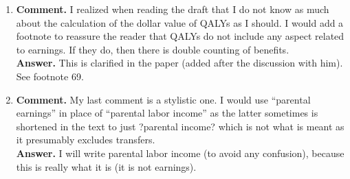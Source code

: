 \begin{enumerate}
\item 
\noindent \textbf{Comment.} I realized when reading the draft that I do not know as much about the calculation of the dollar value of QALYs as I should. I would add a footnote to reassure the reader that QALYs do not include any aspect related to earnings. If they do, then there is double counting of benefits.\\

\noindent \textbf{Answer.} This is clarified in the paper (added after the discussion with him). See footnote 69.\\

\item 
\noindent \textbf{Comment.} My last comment is a stylistic one. I would use ``parental earnings'' in place of ``parental labor income'' as the latter sometimes is shortened in the text to just ?parental income? which is not what is meant as it presumably excludes transfers.\\ 

\noindent \textbf{Answer.} I will write parental labor income (to avoid any confusion), because this is really what it is (it is not earnings).\\

\end{enumerate}




\singlespace






